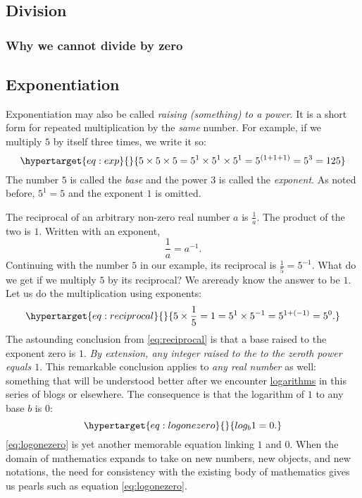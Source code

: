 \documentclass[
  a4paper,
]{article}
\begin{document}
\hypertarget{division}{%
\subsection{Division}\label{division}}

\hypertarget{why-we-cannot-divide-by-zero}{%
\subsubsection{Why we cannot divide by
zero}\label{why-we-cannot-divide-by-zero}}

\hypertarget{exponentiation}{%
\subsection{Exponentiation}\label{exponentiation}}

Exponentiation may also be called \emph{raising (something) to a power}.
It is a short form for repeated multiplication by the \emph{same}
number. For example, if we multiply \(5\) by itself three times, we
write it so: \begin{equation}\protect\hypertarget{eq:exp}{}{
5\times5\times5 = 5^1\times5^1\times5^1 = 5^{(1+1+1)} = 5^{3} = 125
}\label{eq:exp}\end{equation} The number \(5\) is called the \emph{base}
and the power \(3\) is called the \emph{exponent}. As noted before,
\(5^1 = 5\) and the exponent \(1\) is omitted.

The reciprocal of an arbitrary non-zero real number \(a\) is
\(\frac{1}{a}\). The product of the two is \(1\). Written with an
exponent, \[
\frac{1}{a} = a^{-1}.
\] Continuing with the number \(5\) in our example, its reciprocal is
\(\frac{1}{5} = 5^{-1}\). What do we get if we multiply \(5\) by its
reciprocal? We areready know the answer to be \(1\). Let us do the
multiplication using exponents:
\begin{equation}\protect\hypertarget{eq:reciprocal}{}{
5 \times \frac{1}{5} = 1 = 5^{1} \times 5^{-1} = 5^{1+(-1)} = 5^{0}.
}\label{eq:reciprocal}\end{equation} The astounding conclusion from
\cref{eq:reciprocal} is that a base raised to the exponent zero is
\({1}\). \emph{By extension, any integer raised to the to the zeroth
power equals \(1\)}. This remarkable conclusion applies to \emph{any
real number} as well: something that will be understood better after we
encounter
\href{https://www.britannica.com/science/logarithm}{logarithms} in this
series of blogs or elsewhere. The consequence is that the logarithm of
\(1\) to any base \(b\) is \(0\):
\begin{equation}\protect\hypertarget{eq:logonezero}{}{
log_{b}1 = 0.
}\label{eq:logonezero}\end{equation} \cref{eq:logonezero} is yet another
memorable equation linking \(1\) and \(0\). When the domain of
mathematics expands to take on new numbers, new objects, and new
notations, the need for consistency with the existing body of
mathematics gives us pearls such as equation \cref{eq:logonezero}.
\end{document}
